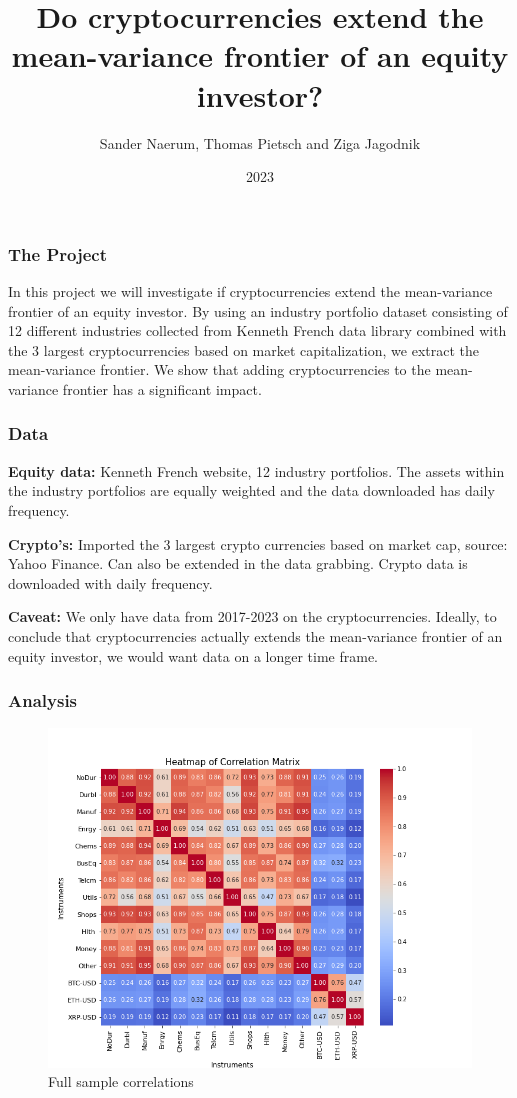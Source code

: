 \documentclass{beamer}
\title{Do cryptocurrencies extend the mean-variance frontier of an equity investor?}
\author{Sander Naerum, Thomas Pietsch and Ziga Jagodnik}
\institute{UZH}
\date{2023}
\begin{document}
\frame{\titlepage}

\begin{frame}
\frametitle{The Project}
In this project we will investigate if cryptocurrencies extend the mean-variance frontier of an equity investor. 
By using an industry portfolio dataset consisting of 12 different industries collected from Kenneth French data 
library combined with the 3 largest cryptocurrencies based on market capitalization, we extract the mean-variance 
frontier. We show that adding cryptocurrencies to the mean-variance frontier has a significant impact.
\end{frame}

\begin{frame}
\frametitle{Data}
\textbf{Equity data:} Kenneth French website, 12 industry portfolios. The assets within the industry portfolios are 
equally weighted and the data downloaded has daily frequency. 

\noindent\textbf{Crypto's:} Imported the 3 largest crypto currencies based on market cap, source: Yahoo Finance. 
Can also be extended in the data grabbing. Crypto data is downloaded with daily frequency.  

\noindent \textbf{Caveat:} We only have data from 2017-2023 on the cryptocurrencies. Ideally, to conclude that 
cryptocurrencies actually extends the mean-variance frontier of an equity investor, we would want data on a longer time frame.    
\end{frame}


\begin{frame}
\frametitle{Analysis}
\begin{figure}
    \centering
    \includegraphics[width=0.8\linewidth]{Figures/heatmap_correlation.png}
    \caption{Full sample correlations}
    \label{fig:corr}
\end{figure}
\end{frame}
\end{document}
